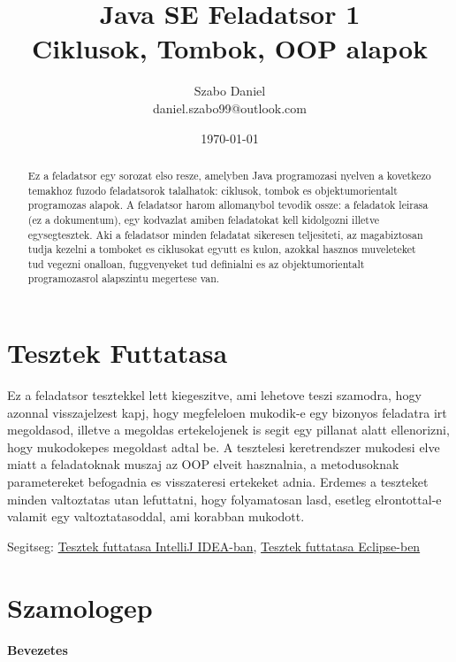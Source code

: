 \documentclass{article}
\title{%
Java SE Feladatsor 1 \\
\large Ciklusok, Tombok, OOP alapok}
\author{Szabo Daniel\\daniel.szabo99@outlook.com}
\date{\today}
\begin{document}
\maketitle
\begin{abstract}
Ez a feladatsor egy sorozat elso resze, amelyben Java programozasi nyelven a kovetkezo temakhoz fuzodo feladatsorok talalhatok: ciklusok, tombok es objektumorientalt programozas alapok. A feladatsor harom allomanybol tevodik ossze: a feladatok leirasa (ez a dokumentum), egy kodvazlat amiben feladatokat kell kidolgozni illetve egysegtesztek.
Aki a feladatsor minden feladatat sikeresen teljesiteti, az magabiztosan tudja kezelni a tomboket es ciklusokat egyutt es kulon, azokkal hasznos muveleteket tud vegezni onalloan, fuggvenyeket tud definialni es az objektumorientalt programozasrol alapszintu megertese van.
\end{abstract}

\newpage

\tableofcontents{}

\newpage

\section{Tesztek Futtatasa}

Ez a feladatsor tesztekkel lett kiegeszitve, ami lehetove teszi szamodra, hogy azonnal visszajelzest kapj, hogy megfeleloen mukodik-e egy bizonyos feladatra irt megoldasod, illetve a megoldas ertekelojenek is segit egy pillanat alatt ellenorizni, hogy mukodokepes megoldast adtal be. A tesztelesi keretrendszer mukodesi elve miatt a feladatoknak muszaj az OOP elveit hasznalnia, a metodusoknak parametereket befogadnia es visszateresi ertekeket adnia. Erdemes a teszteket minden valtoztatas utan lefuttatni, hogy folyamatosan lasd, esetleg elrontottal-e valamit egy valtoztatasoddal, ami korabban mukodott.

Segitseg: \href{https://www.jetbrains.com/help/idea/performing-tests.html}{Tesztek futtatasa IntelliJ IDEA-ban}, \href{https://www.tutorialspoint.com/junit/junit_plug_with_eclipse.htm}{Tesztek futtatasa Eclipse-ben}

\newpage

\section{Szamologep}

\paragraph{Bevezetes}
\end{document}
